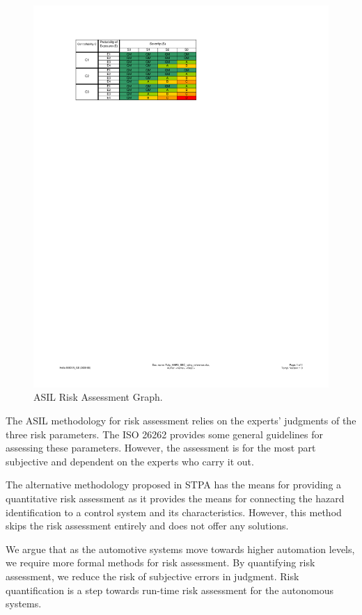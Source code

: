 \begin{figure}
	\centering
	\includegraphics[width=0.9\linewidth]{./figures/ASIL}
	\caption{ASIL Risk Assessment Graph.}
	\label{Fig:ASILGraph}
\end{figure}

The ASIL methodology for risk assessment relies on the experts’ judgments of the three risk parameters. The ISO 26262 provides some general guidelines for assessing these parameters. However, the assessment is for the most part subjective and dependent on the experts who carry it out. 

The alternative methodology proposed in STPA has the means for providing a quantitative risk assessment as it provides the means for connecting the hazard identification to a control system and its characteristics. However, this method skips the risk assessment entirely and does not offer any solutions. 

We argue that as the automotive systems move towards higher automation levels, we require more formal methods for risk assessment. By quantifying risk assessment, we reduce the risk of subjective errors in judgment. Risk quantification is a step towards run-time risk assessment for the autonomous systems.  


